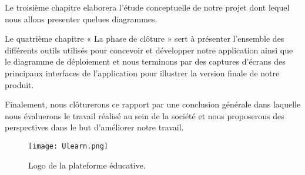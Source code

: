 Le troisième chapitre elaborera l’étude conceptuelle de notre projet dont lequel nous allons
presenter quelues diagrammes.

\medskip

Le quatrième chapitre « La phase de clôture » sert à présenter l’ensemble des différents outils
utilisés pour concevoir et développer notre application ainsi que le diagramme de déploiement
et nous terminons par des captures d’écrans des principaux interfaces de l’application pour
illustrer la version finale de notre produit.

\medskip

Finalement, nous clôturerons ce rapport par une conclusion générale dans laquelle nous évaluerons le travail réalisé au sein de la société et nous proposerons des perspectives dans le but
d’améliorer notre travail.

\medskip

\begin{figure}[hbt!]
	\centering
	\texttt{[image: Ulearn.png]}
	\caption{Logo de la plateforme éducative.}
	\label{fig:Logo de la plateforme éducative}
\end{figure}